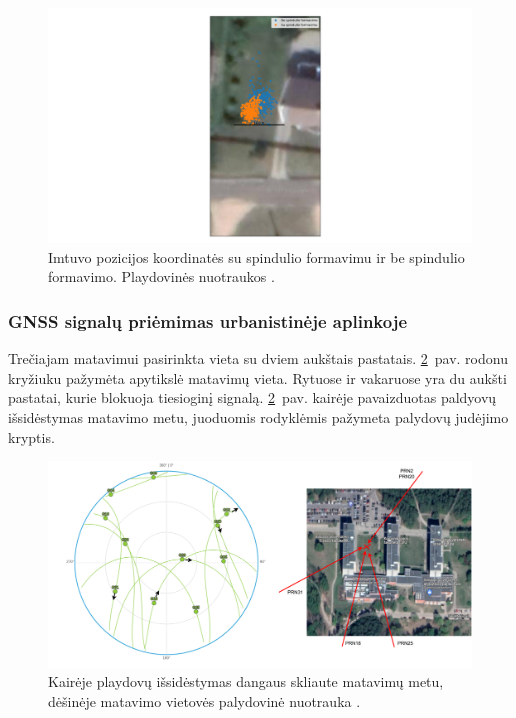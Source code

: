 \documentclass[main.tex]{subfiles}
\begin{document}
\begin{figure}[ht]
    \begin{centering}
    \hspace*{-4cm}\includegraphics[scale=0.5]{drawings/one_reflection_map}
    \par\end{centering}
    \protect\caption{\label{fig:single_reflection_map}Imtuvo pozicijos koordinatės su spindulio formavimu ir be spindulio formavimo. Playdovinės nuotraukos \cite{google_maps}.}
\end{figure}

\subsubsection{GNSS signalų priėmimas urbanistinėje aplinkoje}\label{sec:gnss_meas_two_reflection}

Trečiajam matavimui pasirinkta vieta su dviem aukštais pastatais.
\ref{fig:two_reflection_sat_pos}~pav. rodonu kryžiuku pažymėta apytikslė matavimų
vieta. Rytuose ir vakaruose yra du aukšti pastatai, kurie blokuoja tiesioginį signalą. 
\ref{fig:two_reflection_sat_pos}~pav. kairėje pavaizduotas paldyovų išsidėstymas
matavimo metu, juoduomis rodyklėmis pažymeta palydovų judėjimo kryptis.

\begin{figure}[ht]
    \begin{centering}
    \includegraphics[scale=0.4]{drawings/vu_sats_map.drawio}
    \par\end{centering}
    \protect\caption{\label{fig:two_reflection_sat_pos}Kairėje playdovų išsidėstymas dangaus skliaute matavimų metu, dėšinėje matavimo vietovės palydovinė nuotrauka \cite{google_maps}.}
\end{figure}
\end{document}

